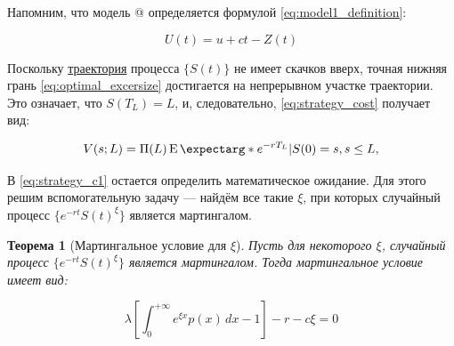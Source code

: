 \documentclass[a4paper,12pt]{article}
\makeatletter
\newtheorem{theorem}{Теорема}
\theoremstyle{definition}
\newcommand*{\rom}[1]{\expandafter\@slowromancap\romannumeral #1@}
\newcommand{\expect}{\operatorname{E}\expectarg}
\makeatother
\begin{document}
Напомним, что модель \rom{1} определяется формулой \eqref{eq:model1_definition}:

\begin{equation*}
    U (t) = u + c t - Z(t)
\end{equation*}

Поскольку \hyperref[fig:model1tracklcross]{траектория} процесса $\{S(t)\}$ не имеет скачков вверх, точная нижняя грань \eqref{eq:optimal_excersize} достигается на непрерывном участке траектории. Это означает, что $S(T_L) = L$, и, следовательно, \eqref{eq:strategy_cost} получает вид:

\begin{equation}\label{eq:strategy_c1}
V(s; L) = \Pi(L) \expect*{e^{-rT_L} | S(0) = s}, s \le L,
\end{equation}

В \eqref{eq:strategy_c1} остается определить математическое ожидание. Для этого решим вспомогательную задачу --- найдём все такие $\xi$, при которых случайный процесс $\{e^{-rt}S(t)^{\xi}\}$ является мартингалом.

\begin{theorem}[Мартингальное условие для $\xi$]\label{thm:martingale_cond_for_xi}
Пусть для некоторого $\xi$, случайный процесс $\{e^{-rt}S(t)^{\xi}\}$ является мартингалом. Тогда мартингальное условие имеет вид:

\begin{equation}\label{eq:martingale_cond_for_xi_log}
\lambda \left[ \int_{0}^{+\infty} e^{\xi x} p(x) \,dx - 1  \right] - r - c \xi
 = 0
\end{equation}

\end{theorem}
\end{document}

